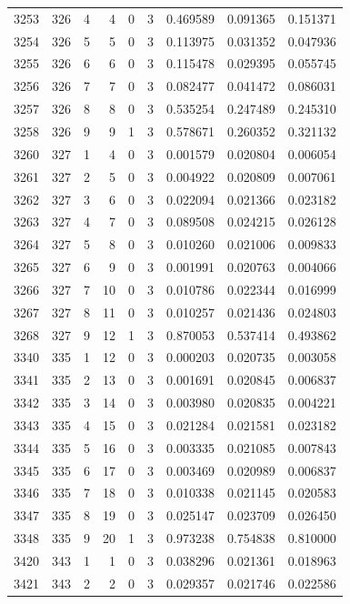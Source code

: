 \begin{longtable}{rrrrrrrrr}
3253 & 326 & 4 & 4 & 0 & 3 & 0.469589 & 0.091365 & 0.151371 \\
3254 & 326 & 5 & 5 & 0 & 3 & 0.113975 & 0.031352 & 0.047936 \\
3255 & 326 & 6 & 6 & 0 & 3 & 0.115478 & 0.029395 & 0.055745 \\
3256 & 326 & 7 & 7 & 0 & 3 & 0.082477 & 0.041472 & 0.086031 \\
3257 & 326 & 8 & 8 & 0 & 3 & 0.535254 & 0.247489 & 0.245310 \\
3258 & 326 & 9 & 9 & 1 & 3 & 0.578671 & 0.260352 & 0.321132 \\
3260 & 327 & 1 & 4 & 0 & 3 & 0.001579 & 0.020804 & 0.006054 \\
3261 & 327 & 2 & 5 & 0 & 3 & 0.004922 & 0.020809 & 0.007061 \\
3262 & 327 & 3 & 6 & 0 & 3 & 0.022094 & 0.021366 & 0.023182 \\
3263 & 327 & 4 & 7 & 0 & 3 & 0.089508 & 0.024215 & 0.026128 \\
3264 & 327 & 5 & 8 & 0 & 3 & 0.010260 & 0.021006 & 0.009833 \\
3265 & 327 & 6 & 9 & 0 & 3 & 0.001991 & 0.020763 & 0.004066 \\
3266 & 327 & 7 & 10 & 0 & 3 & 0.010786 & 0.022344 & 0.016999 \\
3267 & 327 & 8 & 11 & 0 & 3 & 0.010257 & 0.021436 & 0.024803 \\
3268 & 327 & 9 & 12 & 1 & 3 & 0.870053 & 0.537414 & 0.493862 \\
3340 & 335 & 1 & 12 & 0 & 3 & 0.000203 & 0.020735 & 0.003058 \\
3341 & 335 & 2 & 13 & 0 & 3 & 0.001691 & 0.020845 & 0.006837 \\
3342 & 335 & 3 & 14 & 0 & 3 & 0.003980 & 0.020835 & 0.004221 \\
3343 & 335 & 4 & 15 & 0 & 3 & 0.021284 & 0.021581 & 0.023182 \\
3344 & 335 & 5 & 16 & 0 & 3 & 0.003335 & 0.021085 & 0.007843 \\
3345 & 335 & 6 & 17 & 0 & 3 & 0.003469 & 0.020989 & 0.006837 \\
3346 & 335 & 7 & 18 & 0 & 3 & 0.010338 & 0.021145 & 0.020583 \\
3347 & 335 & 8 & 19 & 0 & 3 & 0.025147 & 0.023709 & 0.026450 \\
3348 & 335 & 9 & 20 & 1 & 3 & 0.973238 & 0.754838 & 0.810000 \\
3420 & 343 & 1 & 1 & 0 & 3 & 0.038296 & 0.021361 & 0.018963 \\
3421 & 343 & 2 & 2 & 0 & 3 & 0.029357 & 0.021746 & 0.022586 \\

\end{longtable}
